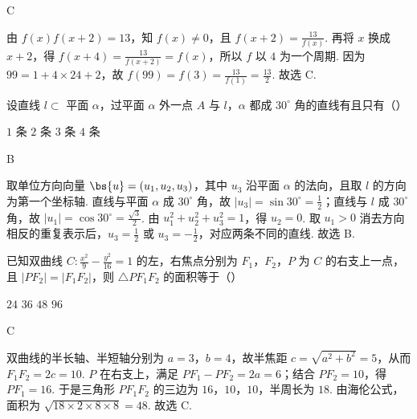 \begin{answer}
C
\end{answer}

\begin{solution}
由 \(f(x)f(x+2)=13\)，知 \(f(x)\ne0\)，且 \(f(x+2)=\frac{13}{f(x)}\). 再将 \(x\) 换成 \(x+2\)，得 \(f(x+4)=\frac{13}{f(x+2)}=f(x)\)，所以 \(f\) 以 \(4\) 为一个周期. 因为 \(99=1+4\times24+2\)，故 \(f(99)=f(3)=\frac{13}{f(1)}=\frac{13}{2}\). 故选 C.
\end{solution}

\begin{problem}
设直线 \(l \subset\) 平面 \(\alpha\)，过平面 \(\alpha\) 外一点 \(A\) 与 \(l\)，\(\alpha\) 都成 \(30^{\circ}\) 角的直线有且只有（\quad）

\choices
    {\(1\) 条}
    {\(2\) 条}
    {\(3\) 条}
    {\(4\) 条}
\end{problem}

\begin{answer}
B
\end{answer}

\begin{solution}
取单位方向向量 \(\bs{u}=\left(u_{1},u_{2},u_{3}\right)\)，其中 \(u_{3}\) 沿平面 \(\alpha\) 的法向，且取 \(l\) 的方向为第一个坐标轴. 直线与平面 \(\alpha\) 成 \(30^{\circ}\) 角，故 \(\lvert u_{3}\rvert=\sin30^{\circ}=\frac12\)；直线与 \(l\) 成 \(30^{\circ}\) 角，故 \(\lvert u_{1}\rvert=\cos30^{\circ}=\frac{\sqrt3}{2}\). 由 \(u_{1}^{2}+u_{2}^{2}+u_{3}^{2}=1\)，得 \(u_{2}=0\). 取 \(u_{1}>0\) 消去方向相反的重复表示后，\(u_{3}=\frac12\) 或 \(u_{3}=-\frac12\)，对应两条不同的直线. 故选 B.
\end{solution}

\begin{problem}
已知双曲线 \(C: \frac{x^{2}}{9} - \frac{y^{2}}{16} = 1\) 的左，右焦点分别为 \(F_{1}\)，\(F_{2}\)，\(P\) 为 \(C\) 的右支上一点，且 \(|PF_{2}| = |F_{1}F_{2}|\)，则 \(\triangle PF_{1}F_{2}\) 的面积等于（\quad）

\choices
    {\(24\)}
    {\(36\)}
    {\(48\)}
    {\(96\)}
\end{problem}

\begin{answer}
C
\end{answer}

\begin{solution}
双曲线的半长轴、半短轴分别为 \(a=3\)，\(b=4\)，故半焦距 \(c=\sqrt{a^{2}+b^{2}}=5\)，从而 \(F_{1}F_{2}=2c=10\). \(P\) 在右支上，满足 \(PF_{1}-PF_{2}=2a=6\)；结合 \(PF_{2}=10\)，得 \(PF_{1}=16\). 于是三角形 \(PF_{1}F_{2}\) 的三边为 \(16\)，\(10\)，\(10\)，半周长为 \(18\). 由海伦公式，面积为 \(\sqrt{18\times2\times8\times8}=48\). 故选 C.
\end{solution}

